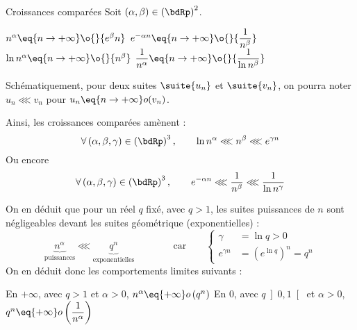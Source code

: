 \documentclass[a4paper,french,bookmarks]{article}
\begin{document}
\begin{theorem}{Croissances comparées}{}
    Soit $\left(\alpha, \beta\right) \in \left(\bdRp\right)^2$.
    
    \begin{enumerate}
    \begin{multicols}{2}
        \itarr $n^\alpha \eq{n \to +\infty} \o{}{e^\beta n}$
        \itarr $e^{-\alpha n} \eq{n \to +\infty} \o{}{\dfrac{1}{n^\beta}}$
        \itarr $\ln{n}^\alpha \eq{n \to +\infty} \o{}{n^\beta}$
        \itarr $\dfrac{1}{n^\alpha} \eq{n \to +\infty} \o{}{\dfrac{1}{\ln{n}^\beta}}$
    \end{multicols}
    \end{enumerate}
\end{theorem}

Schématiquement, pour deux suites $\suite{u_n}$ et $\suite{v_n}$, on pourra noter $u_n \lll v_n$ pour $u_n \eq{n \to +\infty} o(v_n)$.

Ainsi, les croissances comparées amènent :
\[\forall \left(\alpha, \beta, \gamma\right) \in \left(\bdRp\right)^3, \qquad \ln{n}^\alpha \lll n^\beta \lll e^{\gamma n}\]
Ou encore
\[\forall \left(\alpha, \beta, \gamma\right) \in \left(\bdRp\right)^3, \qquad e^{-\alpha n} \lll \dfrac{1}{n^\beta} \lll \dfrac{1}{\ln{n}^\gamma}\]

On en déduit que pour un réel $q$ fixé, avec $q > 1$, les suites puissances de $n$ sont négligeables devant les suites géométrique (exponentielles) :
\[ \underbrace{n^\alpha}_{\text{puissances}} \lll \underbrace{q^n}_{\text{exponentielles}} \qquad\qquad \text{car}\qquad \left\lbrace\begin{array}{ll}
    \gamma & = \ln q > 0  \\
    e^{\gamma n} &= \left(e^{\ln q}\right)^n = q^n
\end{array}\right.\]
On en déduit donc les comportements limites suivants :
\begin{enumerate}
\begin{multicols}{2}
    \ithand En $+\infty$, avec $q > 1$ et $\alpha > 0$, $n^\alpha \eq{+\infty} o\left(q^n\right)$
    \ithand En $0$, avec $q \left]0,1\right[$ et $\alpha > 0$, $q^n \eq{+\infty} o\left(\dfrac{1}{n^\alpha}\right)$
\end{multicols}
\end{enumerate}
\end{document}

